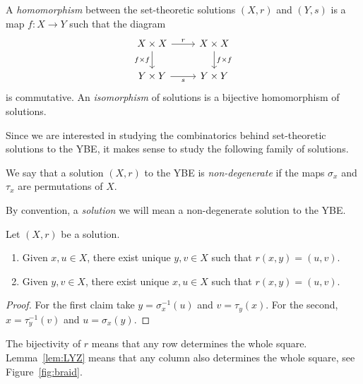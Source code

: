 \begin{definition}
A \emph{homomorphism} between the set-theoretic solutions $(X,r)$ and
$(Y,s)$ is a map $f\colon X\to Y$ such that the diagram 
\[\begin{tikzcd}
	{X\times X} & {X\times X} \\
	{Y\times Y} & {Y\times Y}
	\arrow["r", from=1-1, to=1-2]
	\arrow["{f\times f}"', from=1-1, to=2-1]
	\arrow["{f\times f}", from=1-2, to=2-2]
	\arrow["s"', from=2-1, to=2-2]
\end{tikzcd}
\]
is commutative. An \emph{isomorphism} of solutions is a bijective
homomorphism of solutions.
\end{definition}

Since we are interested in studying the combinatorics behind set-theoretic solutions to the YBE,
it makes sense to study the following family of solutions. 

\begin{definition}
We say that a solution $(X,r)$ to the YBE 
is \emph{non-degenerate} if the maps $\sigma_x$ and $\tau_x$ are 
permutations of $X$. 
\end{definition}

By convention, a \emph{solution} we will mean a non-degenerate solution to the YBE.

\begin{lemma}
\label{lem:LYZ}
Let $(X,r)$ be a solution. 
\begin{enumerate}
    \item Given $x,u\in X$, there exist unique $y,v\in X$ such that $r(x,y)=(u,v)$. 
    \item Given $y,v\in X$, there exist unique $x,u\in X$ such that $r(x,y)=(u,v)$. 
\end{enumerate}
\end{lemma}

\begin{proof}
    For the first claim take $y=\sigma_x^{-1}(u)$ and $v=\tau_y(x)$. 
    For the second, $x=\tau_y^{-1}(v)$ and $u=\sigma_x(y)$. 
\end{proof}

The bijectivity of $r$ means that any row determines the whole square. Lemma~\ref{lem:LYZ}
means that any column also determines the whole square, see Figure~\ref{fig:braid}.

